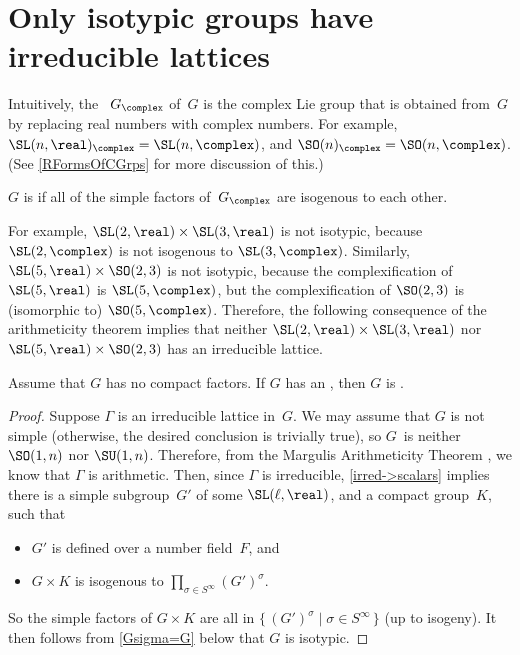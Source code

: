 \section{Only isotypic groups have irreducible lattices}

Intuitively, the ~$G_\complex$ of~$G$ is the
complex Lie group that is obtained from~$G$ by replacing
real numbers with complex numbers. 
For example, $\SL(n,\real)_\complex = \SL(n,\complex)$, and $\SO(n)_\complex = \SO(n,\complex)$.
(See \cref{RFormsOfCGrps} for more discussion of this.)

\begin{defn} \label{IsotypicDefn}
 $G$ is  if
all of the simple factors of~$G_\complex$ are isogenous to each other.
 \end{defn}

For example, $\SL(2,\real) \times \SL(3,\real)$ is not
isotypic, because $\SL(2,\complex)$ is not isogenous to $\SL(3,\complex)$.
Similarly, $\SL(5,\real)
\times \SO(2,3)$ is not isotypic, because the complexification of 
 $\SL(5,\real)$ is $\SL(5,\complex)$, but the complexification of $\SO(2,3)$ is (isomorphic to) $\SO(5, \complex)$. Therefore, the
following consequence of the arithmeticity theorem implies
that neither $\SL(2,\real) \times \SL(3,\real)$ nor
$\SL(5,\real) \times \SO(2,3)$ has an irreducible lattice.

\begin{thm}[(Margulis)] \label{irred->isotypic}
 Assume that $G$ has no compact factors. 
If $G$ has an , then $G$ is .
 \end{thm}

\begin{proof} 
Suppose $\Gamma$ is an irreducible lattice
in~$G$. We may assume that $G$ is not simple (otherwise,
the desired conclusion is trivially true), so $G$~is
neither $\SO(1,n)$ nor $\SU(1,n)$. Therefore, from the Margulis
Arithmeticity Theorem , we know that
$\Gamma$ is arithmetic. Then, since $\Gamma$ is irreducible,
\cref{irred->scalars} implies there is a simple subgroup~$G'$ of some $\SL(\ell,\real)$, and a compact group~$K$,
such that
 \begin{itemize}
 \item $G'$ is defined over a number field~$F$, 
 and
 \item $G  \times K$ is isogenous to $\prod_{\sigma \in S^\infty}
(G')^\sigma$.
 \end{itemize}
 So the simple factors of $G \times K$ are all in $\{\, (G')^\sigma \mid \sigma \in S^\infty\,\}$ (up to isogeny). 
 It then follows from \cref{Gsigma=G} below that $G$ is isotypic.
 \end{proof}

